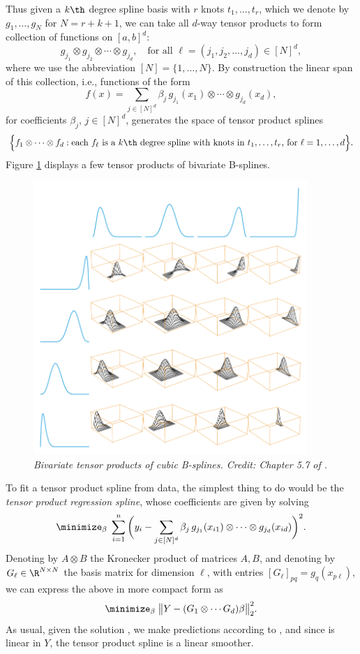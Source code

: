 \documentclass{article}
\begin{document}
Thus given a $k\th$ degree spline basis with $r$ knots $t_1,\dots,t_r$, which we
denote by $g_1,\dots,g_N$ for $N=r+k+1$, we can take all $d$-way tensor
products to form collection of functions on $[a,b]^d$:
\[
g_{j_1} \otimes g_{j_2} \otimes \cdots \otimes g_{j_d}, \quad \text{for all
  $\ell = (j_1, j_2, \dots, j_d) \in [N]^d$}, 
\]
where we use the abbreviation $[N] = \{1,\dots,N\}$. By construction the linear
span of this collection, i.e., functions of the form    
\[
f(x) = \sum_{j \in [N]^d} \beta_j \, g_{j_1}(x_1) \otimes \cdots \otimes 
g_{j_d}(x_d),   
\]
for coefficients $\beta_j$, $j \in [N]^d$, generates the space of tensor 
product splines 
\[
\Big\{ f_1 \otimes \cdots \otimes f_d : \text{each $f_\ell$ is a $k\th$ degree
  spline with knots in $t_1,\dots,t_r$, for $\ell=1,\dots,d$} \Big\}.  
\]
Figure \ref{fig:tensor} displays a few tensor products of bivariate B-splines.

\begin{figure}[!t]
\centering
\includegraphics[width=0.925\textwidth]{tensor.png}
\caption{\it Bivariate tensor products of cubic B-splines. Credit: Chapter 5.7
  of \citet{hastie2009elements}.}    
\label{fig:tensor}
\end{figure}

To fit a tensor product spline from data, the simplest thing to do would be the 
\emph{tensor product regression spline}, whose coefficients are given by solving  
\[
\minimize_\beta \; \sum_{i=1}^n \bigg(y_i -  \sum_{j \in [N]^d} \beta_j \,
g_{j_1}(x_{i1}) \otimes \cdots \otimes g_{j_d}(x_{id}) \bigg)^2. 
\]
Denoting by $A \otimes B$ the Kronecker product of matrices $A,B$, and denoting
by $G_\ell \in \R^{N \times N}$ the basis matrix for dimension $\ell$, with
entries $[G_\ell]_{pq} = g_q(x_{p\ell})$, we can express the above in more
compact form as  
\[
\minimize_\beta \; \big\| Y - (G_1 \otimes \cdots G_d) \beta \big\|_2^2. 
\]
As usual, given the solution \smash{$\hbeta$},  we make predictions according to
, and since \smash{$\hbeta$} is linear in $Y$, the
tensor product spline \smash{$\hf$} is a linear smoother.
\end{document}
